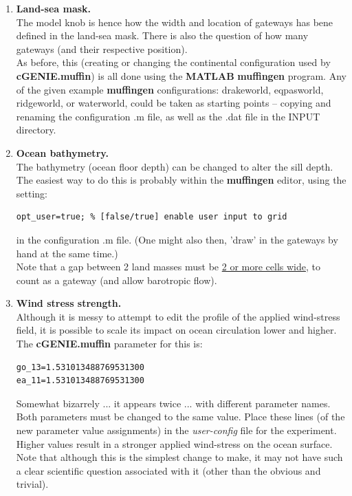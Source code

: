 \documentclass[11pt,fleqn]{book} %
\begin{document}
\vspace{2mm}
\begin{enumerate}
\item \textbf{Land-sea mask.}
\\The model knob is hence how the width and location of gateways has bene defined in the land-sea mask. There is also the question of how many gateways (and their respective position).
\\As before, this (creating or changing the continental configuration used by \textbf{cGENIE.muffin}) is all done using the \textbf{MATLAB} \textbf{muffingen} program. Any of the given example \textbf{muffingen} configurations: \textsf{drakeworld}, \textsf{eqpasworld}, \textsf{ridgeworld}, or \textsf{waterworld}, could be taken as starting points -- copying and renaming the configuration \textsf{.m} file, as well as the \textsf{.dat} file in the \textsf{INPUT} directory.
\vspace{2mm}
\item \textbf{Ocean bathymetry.}
\\The bathymetry (ocean floor depth) can be changed to alter the sill depth. The easiest way to do this is probably within the \textbf{muffingen} editor, using the setting:
\vspace{-2pt}\begin{verbatim}
opt_user=true; % [false/true] enable user input to grid
\end{verbatim}\vspace{-2pt}
in the configuration \textsf{.m} file. (One might also then, 'draw' in the gateways by hand at the same time.)
\\Note that a gap between 2 land masses must be \uline{2 or more cells wide}, to count as a gateway (and allow barotropic flow).
\vspace{2mm}
\item \textbf{Wind stress strength.}
\\Although it is messy to attempt to edit the profile of the applied wind-stress field, it is possible to scale its impact on ocean circulation lower and higher. The \textbf{cGENIE.muffin} parameter for this is:
\vspace{-2pt}\begin{verbatim}
go_13=1.531013488769531300
ea_11=1.531013488769531300
\end{verbatim}\vspace{-2pt}
Somewhat bizarrely ... it appears twice ... with different parameter names. Both parameters must be changed to the same value. Place these lines (of the new parameter value assignments) in the \textit{user-config} file for the experiment. Higher values result in a stronger applied wind-stress on the ocean surface.
\\Note that although this is the simplest change to make, it may not have such a clear scientific question associated with it (other than the obvious and trivial).
\end{enumerate}
\vspace{2mm}
\end{document}
